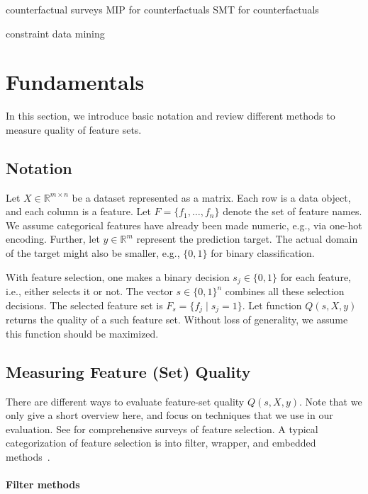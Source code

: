 \documentclass{article}
\theoremstyle{definition}
\begin{document}
counterfactual surveys \cite{verma2020counterfactual, stepin2021survey}
MIP for counterfactuals \cite{mohammadi2021scaling}
SMT for counterfactuals \cite{karimi2020model}

constraint data mining \cite{grossi2017survey}

\section{Fundamentals}
\label{sec:fundamentals}

In this section, we introduce basic notation and review different methods to measure quality of feature sets.

\subsection{Notation}
\label{sec:fundamentals:notation}

Let $X \in \mathbb{R}^{m \times n}$ be a dataset represented as a matrix.
Each row is a data object, and each column is a feature.
Let $F = \{f_1, \dots, f_n\}$ denote the set of feature names.
We assume categorical features have already been made numeric, e.g., via one-hot encoding.
Further, let $y \in \mathbb{R}^m$ represent the prediction target.
The actual domain of the target might also be smaller, e.g., $\{0,1\}$ for binary classification.

With feature selection, one makes a binary decision $s_j \in \{0,1\}$ for each feature, i.e., either selects it or not.
The vector $s \in \{0,1\}^n$ combines all these selection decisions.
The selected feature set is $F_s = \{f_j \mid s_j=1\}$.
Let function $Q(s,X,y)$ returns the quality of a such feature set.
Without loss of generality, we assume this function should be maximized.

\subsection{Measuring Feature (Set) Quality}
\label{sec:fundamentals:quality}

There are different ways to evaluate feature-set quality $Q(s,X,y)$.
Note that we only give a short overview here, and focus on techniques that we use in our evaluation.
See \cite{chandrashekar2014survey,li2017feature} for comprehensive surveys of feature selection.
A typical categorization of feature selection is into filter, wrapper, and embedded methods~\cite{guyon2003introduction}.

\paragraph{Filter methods}
\end{document}
